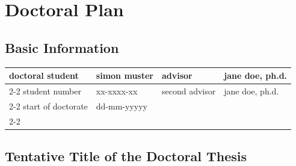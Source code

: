 \documentclass[11pt]{article}
\begin{document}
\thispagestyle{firstpage}

\section*{} %
\vspace{0.25cm} %
\setlength{\headheight}{1 \baselineskip}  %
\setlength{\parindent}{0pt}  %
\setlength{\parskip}{\baselineskip}  %

\section*{Doctoral Plan}
\subsection*{Basic Information}


\begin{table}[h!]
\begin{tabular}{llll}
doctoral student   & simon muster & advisor        & jane doe, ph.d. \\ \cline{2-2} \cline{4-4} 
student number     & xx-xxxx-xx & second advisor & jane doe, ph.d. \\ \cline{2-2} \cline{4-4} 
start of doctorate & dd-mm-yyyyy &                &  \\ \cline{2-2}
\end{tabular}
\end{table}


\subsection*{Tentative Title of the Doctoral Thesis}
\end{document}
